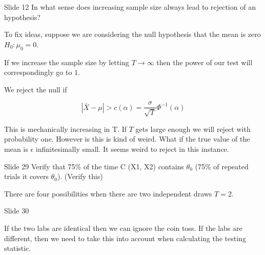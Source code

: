 \documentclass{article}
\begin{document}
\begin{problem}{Slide 12}
In what sense does increasing sample size always lead to rejection of an hypothesis?
\end{problem}

To fix ideas, suppose we are considering the null hypothesis that the mean is zero $H_0: \mu_0 = 0$.

If we increase the sample size by letting $T\rightarrow \infty$ then the power of our test will correspondingly go to $1$.

We reject the null if 

$$
|\bar{X}-\mu|>c(\alpha)=\frac{\sigma}{\sqrt{T}} \Phi^{-1}(\alpha)
$$

This is mechanically increasing in T. If $T$ gets large enough we will reject with probability one. However is this is kind of weird. What if the true value of the mean is $\epsilon$ infinitesimally small. It seems weird to reject in this instance. 
 

\begin{problem}{Slide 29}
Verify that 75\% of the time C (X1, X2) contains $\theta_0$ (75\% of repeated trials it covers $\theta_0$). (Verify this)
\end{problem}

There are four possibilities when there are two independent draws $T=2$.





\begin{problem}{Slide 30}
\end{problem}

If the two labs are identical then we can ignore the coin toss. 
If the labs are different, then we need to take this into account when calculating the testing statistic.
\end{document}
